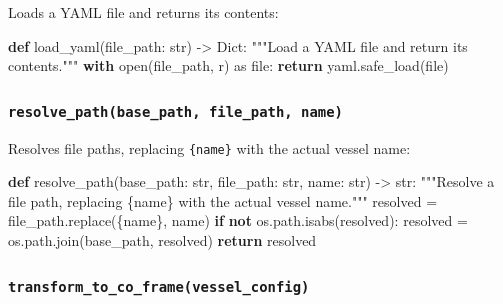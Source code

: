 \documentclass[
  letterpaper,
  DIV=11,
  numbers=noendperiod]{scrreprt}
\newenvironment{Shaded}{\begin{snugshade}}{\end{snugshade}}
\newcommand{\BuiltInTok}[1]{\textcolor[rgb]{0.00,0.23,0.31}{#1}}
\newcommand{\CommentTok}[1]{\textcolor[rgb]{0.37,0.37,0.37}{#1}}
\newcommand{\ControlFlowTok}[1]{\textcolor[rgb]{0.00,0.23,0.31}{\textbf{#1}}}
\newcommand{\ImportTok}[1]{\textcolor[rgb]{0.00,0.46,0.62}{#1}}
\newcommand{\KeywordTok}[1]{\textcolor[rgb]{0.00,0.23,0.31}{\textbf{#1}}}
\newcommand{\NormalTok}[1]{\textcolor[rgb]{0.00,0.23,0.31}{#1}}
\newcommand{\OperatorTok}[1]{\textcolor[rgb]{0.37,0.37,0.37}{#1}}
\newcommand{\SpecialCharTok}[1]{\textcolor[rgb]{0.37,0.37,0.37}{#1}}
\newcommand{\StringTok}[1]{\textcolor[rgb]{0.13,0.47,0.30}{#1}}
\begin{document}
Loads a YAML file and returns its contents:

\begin{Shaded}
\begin{Highlighting}[]
\KeywordTok{def}\NormalTok{ load\_yaml(file\_path: }\BuiltInTok{str}\NormalTok{) }\OperatorTok{{-}\textgreater{}}\NormalTok{ Dict:}
    \CommentTok{"""Load a YAML file and return its contents."""}
    \ControlFlowTok{with} \BuiltInTok{open}\NormalTok{(file\_path, }\StringTok{\textquotesingle{}r\textquotesingle{}}\NormalTok{) }\ImportTok{as} \BuiltInTok{file}\NormalTok{:}
        \ControlFlowTok{return}\NormalTok{ yaml.safe\_load(}\BuiltInTok{file}\NormalTok{)}
\end{Highlighting}
\end{Shaded}

\subsubsection*{\texorpdfstring{\texttt{resolve\_path(base\_path,\ file\_path,\ name)}}{resolve\_path(base\_path, file\_path, name)}}\label{resolve_pathbase_path-file_path-name}

Resolves file paths, replacing \texttt{\{name\}} with the actual vessel
name:

\begin{Shaded}
\begin{Highlighting}[]
\KeywordTok{def}\NormalTok{ resolve\_path(base\_path: }\BuiltInTok{str}\NormalTok{, file\_path: }\BuiltInTok{str}\NormalTok{, name: }\BuiltInTok{str}\NormalTok{) }\OperatorTok{{-}\textgreater{}} \BuiltInTok{str}\NormalTok{:}
    \CommentTok{"""Resolve a file path, replacing \{name\} with the actual vessel name."""}
\NormalTok{    resolved }\OperatorTok{=}\NormalTok{ file\_path.replace(}\StringTok{\textquotesingle{}}\SpecialCharTok{\{name\}}\StringTok{\textquotesingle{}}\NormalTok{, name)}
    \ControlFlowTok{if} \KeywordTok{not}\NormalTok{ os.path.isabs(resolved):}
\NormalTok{        resolved }\OperatorTok{=}\NormalTok{ os.path.join(base\_path, resolved)}
    \ControlFlowTok{return}\NormalTok{ resolved}
\end{Highlighting}
\end{Shaded}

\subsubsection*{\texorpdfstring{\texttt{transform\_to\_co\_frame(vessel\_config)}}{transform\_to\_co\_frame(vessel\_config)}}\label{transform_to_co_framevessel_config}
\end{document}
